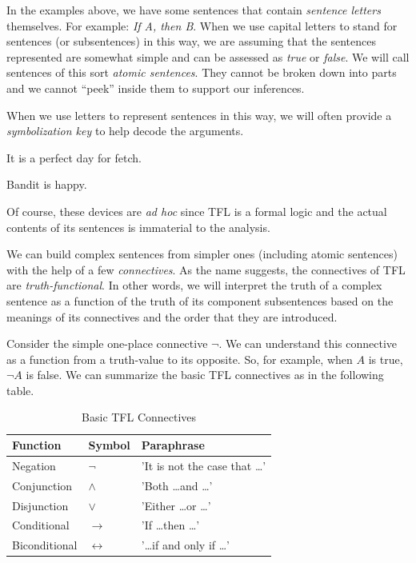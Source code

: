 In the examples above, we have some sentences that contain \emph{sentence
letters} themselves. For example: \emph{If A, then B}. When we use capital
letters to stand for sentences (or subsentences) in this way, we are assuming
that the sentences represented are somewhat simple and can be assessed as
\emph{true} or \emph{false}. We will call sentences of this sort \emph{atomic
sentences}. They cannot be broken down into parts and we cannot ``peek'' inside
them to support our inferences.

When we use letters to represent sentences in this way, we will often provide a
\emph{symbolization key} to help decode the arguments.

\begin{argument}
\item[A:] It is a perfect day for fetch.  
\item[C:] Bandit is happy.
\end{argument}

Of course, these devices are \emph{ad hoc} since TFL is a formal logic and
the actual contents of its sentences is immaterial to the analysis.

We can build complex sentences from simpler ones (including atomic sentences)
with the help of a few \emph{connectives}. As the name suggests, the
connectives of TFL are \emph{truth-functional}. In other words, we will
interpret the truth of a complex sentence as a function of the truth of its
component subsentences based on the meanings of its connectives and the order
that they are introduced.

Consider the simple one-place connective $\lnot$. We can understand this
connective as a function from a truth-value to its opposite. So, for example,
when $A$ is true, $\lnot A$ is false. We can summarize the basic TFL
connectives as in the following table.

\begin{table}[h]
\centering
\begin{tabular}{|l|l|l|}
\hline
\textbf{Function} & \textbf{Symbol} & \textbf{Paraphrase} \\
\hline
Negation & $\lnot$ & 'It is not the case that \dots' \\
Conjunction & $\land$ & 'Both \dots and \dots' \\
Disjunction & $\lor$ & 'Either \dots or \dots' \\
Conditional & $\rightarrow$ & 'If \dots then \dots' \\
Biconditional & $\leftrightarrow$ & '\dots if and only if \dots' \\
\hline
\end{tabular}
\caption{Basic TFL Connectives}
\label{tab:basic-tfl-connectives}
\end{table}


